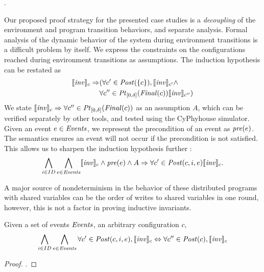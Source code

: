 .

Our proposed proof strategy for the presented case studies is a \emph{decoupling} of the environment and program transition behaviors, and separate analysis. Formal analysis of the dynamic behavior of the system during environment transitions is a difficult problem by itself. We express the constraints on the configurations reached during environment transitions as assumptions. The induction hypothesis can be restated as \begin{align*}\llbracket\mathit{inv}\rrbracket_{c} \Rightarrow &(\forall c' \in \mathit{Post}(\left\{c\right\}), \llbracket\mathit{inv}\rrbracket_{c'} \wedge \\ &\forall c'' \in \mathit{Pt}_{[0,\delta]}(\mathit{Final}(c)) \llbracket\mathit{inv}\rrbracket_{c''})\end{align*} We state $\llbracket\mathit{inv}\rrbracket_{c} \Rightarrow \forall c'' \in \mathit{Pt}_{[0,\delta]}(\mathit{Final}(c)) $ as an assumption $A$, which can be verified separately by other tools, and tested using the CyPhyhouse simulator. Given an event $e\in \mathit{Events}$, we represent the precondition of an event as $\mathit{pre}(e)$. The semantics ensures an event will not occur if the precondition is not satisfied. This allows us to sharpen the induction hypothesis further :
    $$ \bigwedge_{i\in ID} \bigwedge_{e \in \mathit{Events}}  \llbracket\mathit{inv}\rrbracket_{c} \wedge \mathit{pre}(e) \wedge A \Rightarrow \forall c' \in  \mathit{Post}(c, i, e) \llbracket\mathit{inv}\rrbracket_{c}.$$



 A major source of nondeterminism in the behavior of these distributed programs with shared variables can be the order of writes to shared variables in one round, however, this is not a factor in proving inductive invariants.


\begin{lemma}
   \label{noninter}
Given a set of events $\mathit{Events}$, an arbitrary configuration $c$,
   $$\bigwedge_{i\in ID}\bigwedge_{e \in \mathit{Events}} \forall c' \in  \mathit{Post}(c, i, e), \llbracket\mathit{inv}\rrbracket_{c} \Leftrightarrow \forall c'' \in \mathit{Post}(c), \llbracket\mathit{inv}\rrbracket_{c}$$
\end{lemma}
\begin{proof}
   .
\end{proof}



